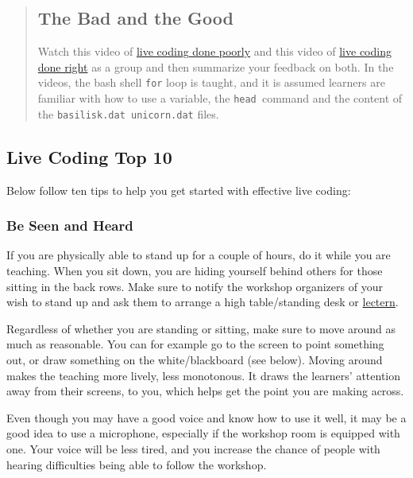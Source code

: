 \begin{quotation}
\subsection*{The Bad and the Good}

Watch this video of \href{https://youtu.be/bXxBeNkKmJE}{live coding done poorly}
and this video of \href{https://youtu.be/SkPmwe\_WjeY}{live coding done right}
as a group and then summarize your feedback on both. 
In the videos, the bash shell \texttt{for} loop is taught, 
and it is assumed learners are familiar with how to use a variable,
the \texttt{head }command and the content of the \texttt{basilisk.dat unicorn.dat}
files.
\end{quotation}

\subsection*{Live Coding Top 10}

Below follow ten tips to help you get started with effective live coding:

\subsubsection*{Be Seen and Heard}

If you are physically able to stand up for a couple of hours, do it
while you are teaching.  When you sit down, you are hiding yourself
behind others for those sitting in the back rows.  Make sure to notify
the workshop organizers of your wish to stand up and ask them to
arrange a high table/standing desk or
\href{https://en.wikipedia.org/wiki/Lectern\#Academic\_context}{lectern}.

Regardless of whether you are standing or sitting, make sure to move
around as much as reasonable.  You can for example go to the screen to
point something out, or draw something on the white/blackboard (see
below).  Moving around makes the teaching more lively, less
monotonous.  It draws the learners' attention away from their screens,
to you, which helps get the point you are making across.

Even though you may have a good voice and know how to use it well, it
may be a good idea to use a microphone, especially if the workshop room is
equipped with one.  Your voice will be less tired, and you increase
the chance of people with hearing difficulties being able to follow
the workshop.


